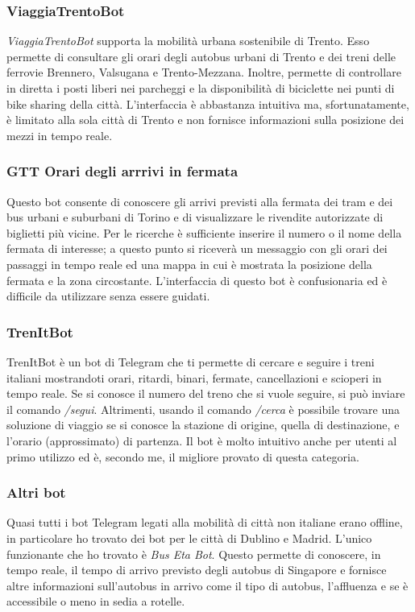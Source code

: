 \subsubsection{ViaggiaTrentoBot}

\textit{ViaggiaTrentoBot} supporta la mobilità urbana sostenibile di Trento. Esso permette di consultare gli orari degli autobus urbani di Trento e dei treni delle ferrovie Brennero, Valsugana e Trento-Mezzana. Inoltre, permette di controllare in diretta i posti liberi nei parcheggi e la disponibilità di biciclette nei punti di bike sharing della città. L'interfaccia è abbastanza intuitiva ma, sfortunatamente, è limitato alla sola città di Trento e non fornisce informazioni sulla posizione dei mezzi in tempo reale.

\subsubsection{GTT Orari degli arrrivi in fermata}
Questo bot consente di conoscere gli arrivi previsti alla fermata dei tram e dei bus urbani e suburbani di Torino e di visualizzare le rivendite autorizzate di biglietti più vicine. Per le ricerche è sufficiente inserire il numero o il nome della fermata di interesse; a questo punto si riceverà un messaggio con gli orari dei passaggi in tempo reale ed una mappa in cui è mostrata la posizione della fermata e la zona circostante. L'interfaccia di questo bot è confusionaria ed è difficile da utilizzare senza essere guidati.

\subsubsection{TrenItBot}

TrenItBot è un bot di Telegram che ti permette di cercare e seguire i treni italiani mostrandoti orari, ritardi, binari, fermate, cancellazioni e scioperi in tempo reale. Se si conosce il numero del treno che si vuole seguire, si può inviare il comando \textit{/segui}. Altrimenti, usando il comando \textit{/cerca} è possibile trovare una soluzione di viaggio se si conosce la stazione di origine, quella di destinazione, e l'orario (approssimato) di partenza. Il bot è molto intuitivo anche per utenti al primo utilizzo ed è, secondo me, il migliore provato di questa categoria.

\subsubsection{Altri bot}
Quasi tutti i bot Telegram legati alla mobilità di città non italiane erano offline, in particolare ho trovato dei bot per le città di Dublino e Madrid. L'unico funzionante che ho trovato è \textit{Bus Eta Bot}. Questo permette di conoscere, in tempo reale, il tempo di arrivo previsto degli autobus di Singapore e fornisce altre informazioni sull'autobus in arrivo come il tipo di autobus, l'affluenza e se è accessibile o meno in sedia a rotelle.

